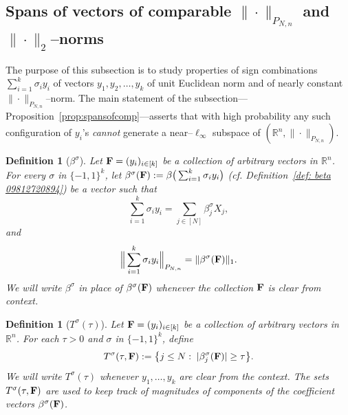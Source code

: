 \documentclass[11pt]{amsart}
\newtheorem{definition}[theorem]{Definition}
\theoremstyle{definition}
\theoremstyle{plain}
\newcommand{\R}{\mathbb{R}}
\def\R{{\mathbb R}}
\begin{document}
\subsection{Spans
of vectors of comparable
$\|\cdot\|_{P_{N,n}}$ and $\|\cdot\|_2$--norms}

The purpose of this subsection
is to study properties of sign combinations
$\sum_{i=1}^k \sigma_i y_i$ of vectors
$y_1,y_2,\dots,y_k$ of unit Euclidean norm
and of nearly constant $\|\cdot\|_{P_{N,n}}$--norm.
The main statement of the
subsection---Proposition~\ref{prop:spansofcomp}---asserts that with high probability any such configuration of $y_i$'s {\it cannot}
generate a near--$\ell_\infty$ subspace of $(\R^n,\|\cdot\|_{P_{N,n}})$.

\begin{definition}[$\beta^\sigma$]\label{def: betasigma 15262}
Let ${\bf F} = (y_i)_{i \in [k]}$ be a collection of arbitrary vectors
in $\R^n$.
For every $\sigma$ in $\{-1,1\}^k$, let 
$\beta^\sigma({\bf F}):=\beta\big(\sum_{i=1}^k \sigma_i y_i\big)$
(cf. Definition~\ref{def: beta 09812720894})
be a vector such that
$$
\sum_{i=1}^k \sigma_i y_i
=\sum_{j\in[N]}\beta_j^\sigma X_j,
$$
and
$$
\Big\|\sum_{i=1}^k \sigma_i y_i\Big\|_{P_{N,n}}
=\|\beta^\sigma({\bf F})\|_1.
$$
We will write $\beta^\sigma$ in place of $\beta^\sigma({\bf F})$
whenever the collection ${\bf F}$ is clear from context.
\end{definition}

\begin{definition}[$T^\sigma(\tau)$]\label{def: Tsigmatau}
Let ${\bf F} = (y_i)_{i \in [k]}$ be a collection of arbitrary vectors
in $\R^n$.
For each $\tau>0$ and $\sigma$ in $\{-1,1\}^k$, define
$$
T^\sigma(\tau, {\bf F}):=\big\{j\leq N:\;|\beta_j^\sigma({\bf F})|\geq \tau\big\}.
$$
We will write $T^\sigma(\tau)$
whenever $y_1,\dots,y_k$ are clear from the context.
The sets $T^\sigma(\tau, {\bf F})$ are used to keep track of magnitudes
of components of the coefficient vectors $\beta^\sigma({\bf F})$.
\end{definition}
\end{document}
